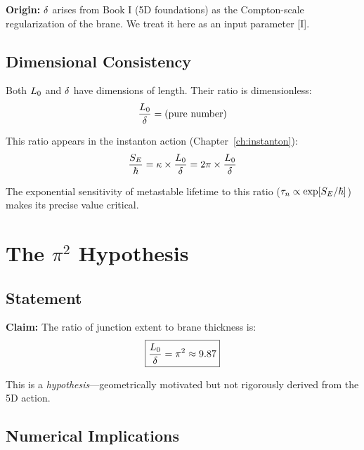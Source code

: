 \textbf{Origin:} $\delta$ arises from Book I (5D foundations) as the Compton-scale
regularization of the brane. We treat it here as an input parameter [I].

\subsection{Dimensional Consistency}

Both $L_0$ and $\delta$ have dimensions of length. Their ratio is dimensionless:
\begin{equation}
    \frac{L_0}{\delta} = \text{(pure number)}
\end{equation}

This ratio appears in the instanton action (Chapter~\ref{ch:instanton}):
\begin{equation}
    \frac{S_E}{\hbar} = \kappa \times \frac{L_0}{\delta} = 2\pi \times \frac{L_0}{\delta}
\end{equation}

The exponential sensitivity of metastable lifetime to this ratio ($\tau_n \propto \exp[S_E/\hbar]$)
makes its precise value critical.

\section{The $\pi^2$ Hypothesis}
\label{sec:L0delta:hypothesis}

\subsection{Statement}

\begin{derivationbox}[title=Hypothesis: $\Lzero/\bdelta = \pi^2$]
    \textbf{Claim:} The ratio of junction extent to brane thickness is:
    \begin{equation}
        \boxed{\frac{L_0}{\delta} = \pi^2 \approx 9.87}
        \label{eq:L0delta_hypothesis}
    \end{equation}
    \tagP
\end{derivationbox}

This is a \emph{hypothesis}---geometrically motivated but not rigorously derived
from the 5D action.

\subsection{Numerical Implications}

